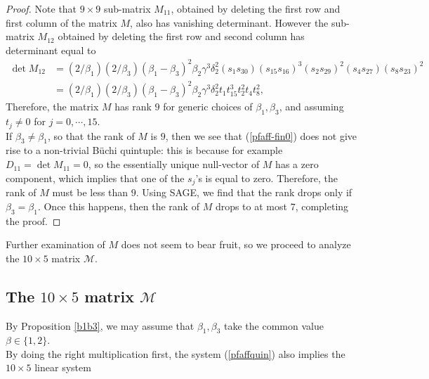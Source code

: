 \documentclass[letterpaper,10pt]{amsart}
\newcommand{\M}{{\mathcal{M}}}
\theoremstyle{definition}
\numberwithin{equation}{section}
\begin{document}
\begin{proof} Note that $9 \times 9$  sub-matrix $M_{11}$, obtained by deleting the first row and first column of the matrix $M$, also has vanishing determinant. However the sub-matrix $M_{12}$ obtained by deleting the first row and second column has determinant equal to 
\begin{align*} \det M_{12}&  = (2/\beta_1)(2/\beta_3)(\beta_1 - \beta_3)^2 \beta_2  \gamma^3 \delta_2^2 (s_1 s_{30}) (s_{15} s_{16})^3 (s_2 s_{29})^2 (s_4 s_{27})( s_8 s_{23})^2 \\
& =(2/\beta_1)(2/\beta_3)(\beta_1 - \beta_3)^2 \beta_2  \gamma^3 \delta_2^2 t_1 t_{15}^3 t_2^2 t_4 t_8^2,
\end{align*}
Therefore, the matrix $M$ has rank $9$ for generic choices of $\beta_1, \beta_3$, and assuming $t_j \ne 0$ for $j = 0, \cdots, 15$.\\

If $\beta_3 \ne \beta_1$, so that the rank of $M$ is $9$, then we see that (\ref{pfaff-fin0}) does not give rise to a non-trivial B\"{u}chi quintuple: this is because for example $D_{11} = \det M_{11} = 0$, so the essentially unique null-vector of $M$ has a zero component, which implies that one of the $s_j$'s is equal to zero. Therefore, the rank of $M$ must be less than $9$. Using SAGE, we find that the rank drops only if $\beta_3 = \beta_1$. Once this happens, then the rank of $M$ drops to at most $7$, completing the proof. \end{proof} 

Further examination of $M$ does not seem to bear fruit, so we proceed to analyze the $10 \times 5$ matrix $\M$. 

\subsection{The $10 \times 5$ matrix $\M$} 

By Proposition \ref{b1b3}, we may assume that $\beta_1, \beta_3$ take the common value $\beta \in \{1,2\}$. \\

By doing the right multiplication first, the system (\ref{pfaffquin}) also implies the $10 \times 5$ linear system
\end{document}
